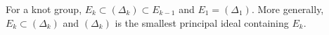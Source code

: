 For a knot group, $E_k \subset (\Delta_k) \subset E_{k-1}$ and $E_1 = (\Delta_1)$. More generally, $E_k \subset (\Delta_k)$ and $(\Delta_k)$ is the smallest principal ideal containing $E_k$.
